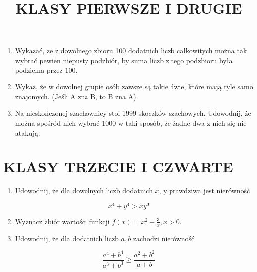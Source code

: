 \documentclass[10pt]{article}
\title{KLASY PIERWSZE I DRUGIE }
\author{}
\date{}
\begin{document}
\maketitle
\begin{enumerate}
  \item Wykazać, ze z dowolnego zbioru 100 dodatnich liczb całkowitych można tak wybrać pewien niepusty podzbiór, by suma liczb z tego podzbioru była podzielna przez 100.
  \item Wykaż, że w dowolnej grupie osób zawsze są takie dwie, które mają tyle samo znajomych. (Jeśli A zna B, to B zna A).
  \item Na nieskończonej szachownicy stoi 1999 skoczków szachowych. Udowodnij, że można spośród nich wybrać 1000 w taki sposób, że żadne dwa z nich się nie atakują.
\end{enumerate}

\section*{KLASY TRZECIE I CZWARTE}
\begin{enumerate}
  \item Udowodnij, że dla dowolnych liczb dodatnich \(x\), y prawdziwa jest nierówność
\end{enumerate}

\[
x^{4}+y^{4}>x y^{3}
\]

\begin{enumerate}
  \setcounter{enumi}{1}
  \item Wyznacz zbiór wartości funkcji \(f(x)=x^{2}+\frac{3}{x}, x>0\).
  \item Udowodnij, że dla dodatnich liczb \(a, b\) zachodzi nierówność
\end{enumerate}

\[
\frac{a^{4}+b^{4}}{a^{3}+b^{3}} \geq \frac{a^{2}+b^{2}}{a+b}
\]
\end{document}
